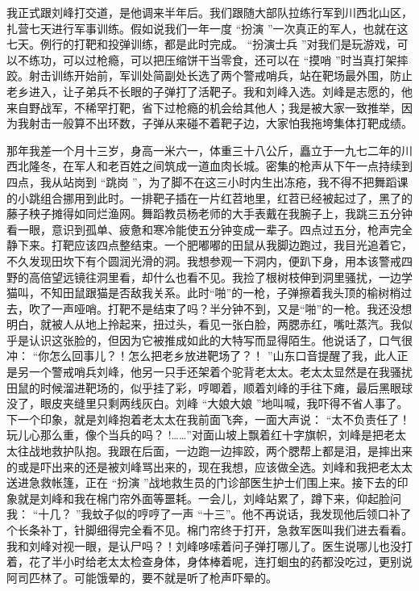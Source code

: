 \documentclass[12pt,twoside,openany]{book}
\begin{document}
我正式跟刘峰打交道，是他调来半年后。我们跟随大部队拉练行军到川西北山区，扎营七天进行军事训练。假如说我们一年一度 “扮演 ”一次真正的军人，也就在这七天。例行的打靶和投弹训练，都是此时完成。 “扮演士兵 ”对我们是玩游戏，可以不练功，可以过枪瘾，可以把压缩饼干当零食，还可以在 “摸哨 ”时当真打架摔跤。射击训练开始前，军训处简副处长选了两个警戒哨兵，站在靶场最外围，防止老乡进入，让子弟兵不长眼的子弹打了活靶子。我和刘峰入选。刘峰是志愿的，他来自野战军，不稀罕打靶，省下过枪瘾的机会给其他人；我是被大家一致推举，因为我射击一般算不出环数，子弹从来碰不着靶子边，大家怕我拖垮集体打靶成绩。

那年我差一个月十三岁，身高一米六一，体重三十八公斤，矗立于一九七二年的川西北隆冬，在军人和老百姓之间筑成一道血肉长城。密集的枪声从下午一点持续到四点，我从站岗到 “跳岗 ”，为了脚不在这三小时内生出冻疮，我不得不把舞蹈课的小跳组合挪用到此时。一排靶子插在一片红苕地里，红苕已经被起过了，黑了的藤子秧子摊得如同烂渔网。舞蹈教员杨老师的大手表戴在我腕子上，我跳三五分钟看一眼，意识到孤单、疲惫和寒冷能使五分钟变成一辈子。四点过五分，枪声完全静下来。打靶应该四点整结束。一个肥嘟嘟的田鼠从我脚边跑过，我目光追着它，不久发现田坎下有个圆润光滑的洞。我想参观一下洞内，便趴下身，用本该警戒四野的高倍望远镜往洞里看，却什么也看不见。我捡了根树枝伸到洞里骚扰，一边学猫叫，不知田鼠跟猫是否敌我关系。此时“啪”的一枪，子弹擦着我头顶的榆树梢过去，吹了一声哑哨。打靶不是结束了吗？半分钟不到，又是“啪”的一枪。我还没想明白，就被人从地上拎起来，扭过头，看见一张白脸，两腮赤红，嘴吐蒸汽。我似乎是认识这张脸的，但因为它被推成如此的大特写而显得陌生。他说话了，口气很冲： “你怎么回事儿？！怎么把老乡放进靶场了？！ ”山东口音提醒了我，此人正是另一个警戒哨兵刘峰，他另一只手还架着个驼背老太太。老太太显然是在我骚扰田鼠的时候溜进靶场的，似乎挂了彩，哼唧着，顺着刘峰的手往下瘫，最后黑眼球没了，眼皮夹缝里只剩两线灰白。刘峰 “大娘大娘 ”地叫喊，我吓得不省人事了。下一个印象，就是刘峰抱着老太太在我前面飞奔，一面大声说： “太不负责任了！玩儿心那么重，像个当兵的吗？ !……”对面山坡上飘着红十字旗帜，刘峰是把老太太往战地救护队抱。我跟在后面，一边跑一边摔跤，两个腮帮上都是泪，是摔出来的或是吓出来的还是被刘峰骂出来的，现在我想，应该做全选。刘峰和我把老太太送进急救帐篷，正在 “扮演 ”战地救生员的门诊部医生护士们围上来。接下去的印象就是刘峰和我在棉门帘外面等噩耗。一会儿，刘峰站累了，蹲下来，仰起脸问我： “十几？ ”我蚊子似的哼哼了一声 “十三”。他不再说话，我发现他后领口补了个长条补丁，针脚细得完全看不见。棉门帘终于打开，急救军医叫我们进去看看。我和刘峰对视一眼，是认尸吗？！刘峰哆嗦着问子弹打哪儿了。医生说哪儿也没打着，花了半小时给老太太检查身体，身体棒着呢，连打蛔虫的药都没吃过，更别说阿司匹林了。可能饿晕的，要不就是听了枪声吓晕的。
\end{document}
